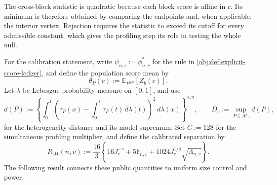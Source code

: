 \documentclass[11pt]{article}
\begin{document}
The cross-block statistic  is quadratic because each block score is affine in \(c\). Its minimum is therefore obtained by comparing the endpoints and, when applicable, the interior vertex. Rejection requires the statistic to exceed its cutoff for every admissible constant, which gives the profiling step its role in testing the whole null.

For the calibration statement, write \(\psi_{n,v}:=\phi^*_{n,v}\) for the rule in \cref{obj:def:explicit-score-ledger}, and define the population score mean  by
\[
\theta_P(c):=\mathbb E_{P^{\otimes n}}[Z_b(c)].
\]
Let \(\lambda\) be Lebesgue probability measure on \([0,1]\), and use
\[
d(P):=
\left\{\int_0^1
\left(\tau_P(x)-\int_0^1\tau_P(t)\,d\lambda(t)\right)^2
\,d\lambda(x)\right\}^{1/2},
\qquad
D_v:=\sup_{P\in\mathcal M_v}d(P),
\]
for the heterogeneity distance and its model supremum. Set \(C:=128\) for the simultaneous profiling multiplier, and define the calibrated separation by
\[
R_{\mathrm{att}}(n,v):=\frac{16}{3}
\left\{
16J_{\mathrm c}^{-\gamma}
+5\mathfrak b_{n,v}
+1024J_{\mathrm c}^{1/4}\sqrt{\Lambda_{n,v}}
\right\}.
\]
The following result connects these public quantities to uniform size control and power.
\end{document}
